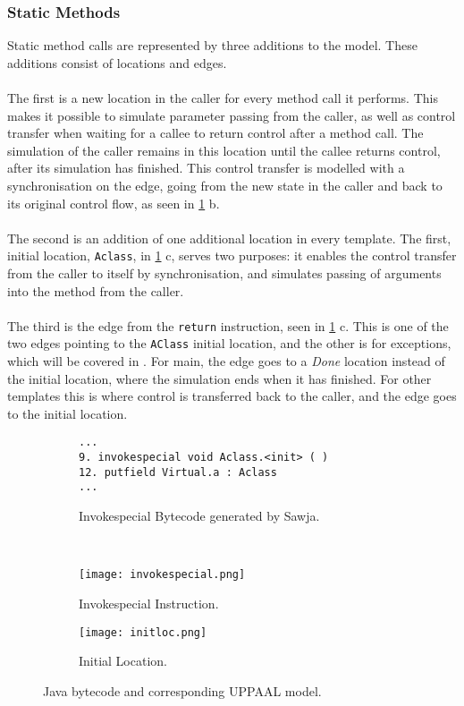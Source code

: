 \subsubsection{Static Methods}
Static method calls are represented by three additions to the model. These additions consist of locations and edges.\\\\ 
The first is a new location in the caller for every method call it performs. This makes it possible to simulate parameter passing from the caller, as well as control transfer when waiting for a callee to return control after a method call. The simulation of the caller remains in this location until the callee returns control, after its simulation has finished. This control transfer is modelled with a synchronisation on the edge, going from the new state in the caller and back to its original control flow, as seen in \cref{fig:invokespecial} b.\\\\
The second is an addition of one additional location in every template. The first, initial location, \texttt{Aclass}, in \cref{fig:invokespecial} c, serves two purposes: it enables the control transfer from the caller to itself by synchronisation, and simulates passing of arguments into the method from the caller.\\\\
The third is the edge from the \texttt{return} instruction, seen in \cref{fig:invokespecial} c. This is one of the two edges pointing to the \texttt{AClass} initial location, and the other is for exceptions, which will be covered in . For main, the edge goes to a \textit{Done} location instead of the initial location, where the simulation ends when it has finished. For other templates this is where control is transferred back to the caller, and the edge goes to the initial location.


\begin{figure}
\centering
\begin{subfigure}{\textwidth}
  \begin{lstlisting}
...
9. invokespecial void Aclass.<init> ( )
12. putfield Virtual.a : Aclass
...
  \end{lstlisting}
  \caption{Invokespecial Bytecode generated by Sawja.}
\end{subfigure} \\
\begin{subfigure}{.65\textwidth}
  \texttt{[image: invokespecial.png]}
  \caption{Invokespecial Instruction.}
\end{subfigure}
\hspace{10px}
\begin{subfigure}{.25\textwidth}
  \texttt{[image: initloc.png]}
  \caption{Initial Location.}
\end{subfigure}
\caption{Java bytecode and corresponding UPPAAL model.}
\label{fig:invokespecial}
\end{figure}


